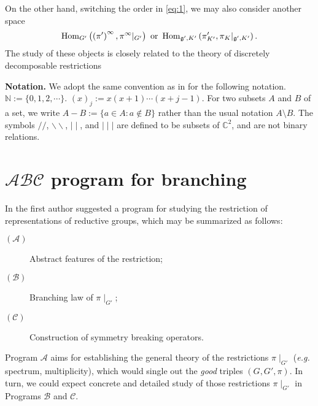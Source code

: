 \documentclass[reqno,12pt]{pja00} %
\theoremstyle{plain}
\theoremstyle{definition}
\theoremstyle{exampstyle} \newtheorem{examp}[theorem]{Theorem}
\newcommand{\Hom}{\operatorname{Hom}}
\let\oldsetminus\setminus
\let\setminus-
\begin{document}
On the other hand, switching the order in \eqref{eq:1}, we may also consider another space
\begin{equation*}
	\Hom_{G'}\left( \left( \pi' \right)^\infty,\pi^\infty\kern-0.1cm\mid_{G'} \right)\mbox{ or }\Hom_{\mathfrak{g}',K'}\left( \pi_{K'}',\pi_{K}\kern-0.1cm\mid_{\mathfrak{g}',K'} \right).
\end{equation*}
The study of these objects is closely related to the theory of discretely decomposable restrictions \cite{kobayashi1998discrete2,kobayashi1998discrete3}

\vskip 0.3pc

{\bf{Notation.}}\enspace
We adopt the same convention as in
{\cite{kobayashi2015symmetry}} for the following notation.
${\mathbb{N}}:=\{0,1,2,\cdots\}$.
$\left( x \right)_j:=x(x+1)\dotsb (x+j-1)$.
For two subsets $A$ and $B$ of a set,
 we write 
$
A \setminus B:=\{a \in A: a \notin B\}
$
rather than the usual notation $A \oldsetminus B$.  
The symbols
$/ /$, $\backslash\backslash$, $\mid\mid$, and $\mid\mid\mid$ are defined to be
subsets of $\mathbb C^2$, and are not binary relations.

  
\section{$\mathcal{A}\mathcal{B}\mathcal{C}$ program for branching}

In {\cite{kobayashi2015program}} the first author suggested a program
for studying the restriction of representations of reductive groups, which may be summarized
as follows:
\begin{description}
  \item[$(\mathcal{A})$] Abstract features of the restriction;
  
  \item[$(\mathcal{B})$] Branching law of $\pi\!\mid_{G'}$;
  
  \item[$(\mathcal{C})$] Construction of symmetry breaking operators.
\end{description}
Program $\mathcal{A}$ aims for establishing the general theory of the restrictions $\pi\!\mid_{G'}$
({\it e.g.} spectrum, multiplicity), which would single out the {\it good} triples $\left( G,G',\pi \right)$. In turn, we could expect concrete and detailed study of those restrictions
$\pi\!\mid_{G'}$ in Programs $\mathcal{B}$ and $\mathcal{C}$.
\end{document}
